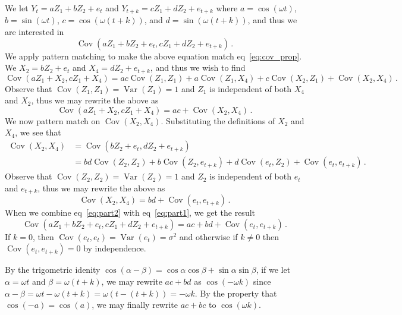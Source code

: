 \documentclass[10pt]{fphw}
\theoremstyle{definition}
\newcommand{\var}{\operatorname{Var}}
\newcommand{\cov}{\operatorname{Cov}}
\begin{document}
\begin{enumerate}
We let $Y_t = a Z_1 + b Z_2 + e_t$ and $Y_{t+k} = c Z_1 + d Z_2 + e_{t+k}$
where $a = \cos(\omega t)$, $b = \sin(\omega t)$, $c = \cos(\omega(t+k))$, and $d = \sin(\omega(t+k))$,
and thus we are interested in
\begin{equation}
    \cov(a Z_1 + b Z_2 + e_t, c Z_1 + d Z_2 + e_{t+k})\,.
\end{equation}
We apply pattern matching to make the above equation match eq~\ref{eq:cov_prop}.
We $X_2 = b Z_2 + e_t$ and $X_4 = d Z_2 + e_{t+k}$, and thus we wish to find
\begin{equation}
    \cov(a Z_1 + X_2, c Z_1 + X_4) = a c \cov(Z_1,Z_1) + a \cov(Z_1,X_4) + c \cov(X_2,Z_1) + \cov(X_2,X_4)\,.
\end{equation}
Observe that $\cov(Z_1,Z_1) = \var(Z_1) = 1$ and $Z_1$ is independent of both $X_4$ and $X_2$, thus we may rewrite
the above as
\begin{equation}
\label{eq:part1}
    \cov(a Z_1 + X_2, c Z_1 + X_4) = a c + \cov(X_2,X_4)\,.
\end{equation}
We now pattern match on $\cov(X_2,X_4)$. Substituting the definitions of $X_2$ and $X_4$,
we see that
\begin{align*}
    \cov(X_2,X_4)
                &= \cov(b Z_2 + e_t, d Z_2 + e_{t+k})\\
                &= b d \cov(Z_2,Z_2) + b \cov(Z_2,e_{t+k}) + d \cov(e_t,Z_2) + \cov(e_t,e_{t+k})\,.
\end{align*}
Observe that $\cov(Z_2,Z_2) = \var(Z_2) = 1$ and $Z_2$ is independent of both $e_t$ and $e_{t+k}$, thus we may rewrite
the above as
\begin{equation}
\label{eq:part2}
    \cov(X_2,X_4) = b d + \cov(e_t,e_{t+k})\,.
\end{equation}
When we combine eq~\ref{eq:part2} with eq~\ref{eq:part1}, we get the result
\begin{equation}
    \cov(a Z_1 + b Z_2 + e_t, c Z_1 + d Z_2 + e_{t+k}) = a c + b d + \cov(e_t,e_{t+k})\,.
\end{equation}
If $k = 0$, then $\cov(e_t,e_t) = \var(e_t) = \sigma^2$ and otherwise if $k\neq 0$ then $\cov(e_t,e_{t+k}) = 0$ by independence.


By the trigometric idenity $\cos (\alpha - \beta) = \cos \alpha \cos \beta + \sin \alpha \sin \beta$, if we let $\alpha = \omega t$ and $\beta = \omega(t+k)$,
we may rewrite $a c + b d$ as $\cos(-\omega k)$ since $\alpha - \beta = \omega t - \omega(t+k) = \omega(t - (t+k)) = -\omega k$.
By the property that $\cos(-a) = \cos(a)$, we may finally rewrite $a c + b c$ to $\cos(\omega k)$.


\end{enumerate}
\end{document}
